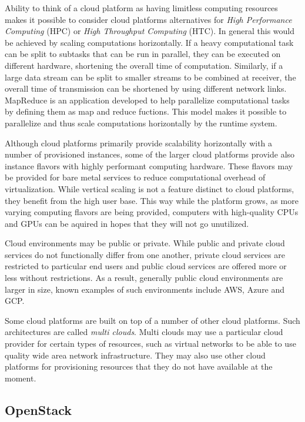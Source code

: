 Ability to think of a cloud platform as having limitless computing resources
makes it possible to consider cloud platforms alternatives for \textit{High
Performance Computing} (HPC) or \textit{High Throughput Computing} (HTC). In
general this would be achieved by scaling computations horizontally. If a heavy
computational task can be split to subtasks that can be run in parallel, they
can be executed on different hardware, shortening the overall time of
computation. Similarly, if a large data stream can be split to smaller streams
to be combined at receiver, the overall time of transmission can be shortened
by using different network links. MapReduce \cite{mapreduce} is an application
developed to help parallelize computational tasks by defining them as map and
reduce fuctions. This model makes it possible to parallelize and thus scale
computations horizontally by the runtime system.

Although cloud platforms primarily provide scalability horizontally with a
number of provisioned instances, some of the larger cloud platforms provide
also instance flavors with highly performant computing hardware. These flavors
may be provided for bare metal services to reduce computational overhead of
virtualization. While vertical scaling is not a feature distinct to cloud
platforms, they benefit from the high user base. This way while the platform
grows, as more varying computing flavors are being provided, computers with
high-quality CPUs and GPUs can be aquired in hopes that they will not go
unutilized.

Cloud environments may be public or private. While public and private cloud
services do not functionally differ from one another, private cloud services
are restricted to particular end users and public cloud services are offered
more or less without restrictions. As a result, generally public cloud
environments are larger in size, known examples of such environments include
AWS, Azure and GCP.

Some cloud platforms are built on top of a number of other cloud platforms.
Such architectures are called \textit{multi clouds}. Multi clouds may use a
particular cloud provider for certain types of resources, such as virtual
networks to be able to use quality wide area network infrastructure. They may
also use other cloud platforms for provisioning resources that they do not have
available at the moment.

\subsection{OpenStack}


